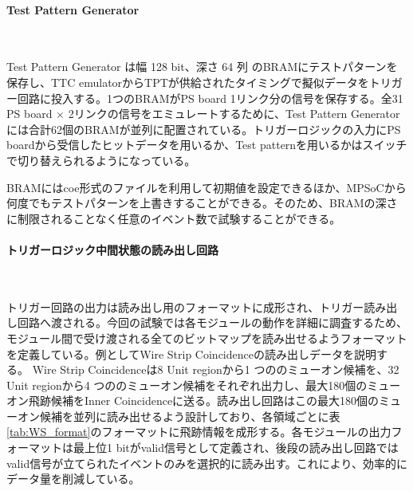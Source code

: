 \paragraph{Test Pattern Generator}　　
\par
Test Pattern Generator は幅 128 bit、深さ 64 列 のBRAMにテストパターンを保存し、TTC emulatorからTPTが供給されたタイミングで擬似データをトリガー回路に投入する。1つのBRAMがPS board 1リンク分の信号を保存する。全31 PS board $\times$ 2リンクの信号をエミュレートするために、Test Pattern Generatorには合計62個のBRAMが並列に配置されている。トリガーロジックの入力にPS boardから受信したヒットデータを用いるか、Test patternを用いるかはスイッチで切り替えられるようになっている。

BRAMにはcoe形式のファイルを利用して初期値を設定できるほか、MPSoCから何度でもテストパターンを上書きすることができる。そのため、BRAMの深さに制限されることなく任意のイベント数で試験することができる。


\paragraph{トリガーロジック中間状態の読み出し回路}　　
\par
トリガー回路の出力は読み出し用のフォーマットに成形され、トリガー読み出し回路へ渡される。今回の試験では各モジュールの動作を詳細に調査するため、モジュール間で受け渡される全てのビットマップを読み出せるようフォーマットを定義している。例としてWire Strip Coincidenceの読み出しデータを説明する。
Wire Strip Coincidenceは8 Unit regionから1 つののミューオン候補を、32 Unit regionから4 つののミューオン候補をそれぞれ出力し、最大180個のミューオン飛跡候補をInner Coincidenceに送る。読み出し回路はこの最大180個のミューオン候補を並列に読み出せるよう設計しており、各領域ごとに表\ref{tab:WS_format}のフォーマットに飛跡情報を成形する。各モジュールの出力フォーマットは最上位1 bitがvalid信号として定義され、後段の読み出し回路ではvalid信号が立てられたイベントのみを選択的に読み出す。これにより、効率的にデータ量を削減している。

